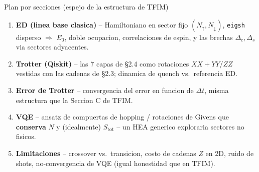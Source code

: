 \documentclass[aspectratio=169,10pt]{beamer}
\newcommand{\good}[1]{\textcolor{qAccent}{\textbf{#1}}}
\begin{document}
\begin{frame}{Plan por secciones (espejo de la estructura de TFIM)}
  \begin{enumerate}
    \item[\good{A}] \textbf{ED (linea base clasica)} -- Hamiltoniano en sector fijo
      $(N_\uparrow,N_\downarrow)$, \texttt{eigsh} disperso $\Rightarrow$ $E_0$, doble ocupacion,
      correlaciones de espin, y las brechas $\Delta_c,\Delta_s$ via sectores adyacentes.
    \item[B] \textbf{Trotter (Qiskit)} -- las 7 capas de \S2.4 como rotaciones
      $XX{+}YY$/$ZZ$ vestidas con las cadenas de \S2.3; dinamica de quench vs.\ referencia ED.
    \item[C] \textbf{Error de Trotter} -- convergencia del error en funcion de $\Delta t$,
      misma estructura que la Seccion C de TFIM.
    \item[D] \textbf{VQE} -- ansatz de compuertas de hopping / rotaciones de Givens que
      \textbf{conserva} $N$ y (idealmente) $S_{\text{tot}}$ -- un HEA generico exploraria
      sectores no fisicos.
    \item[] \textbf{Limitaciones} -- crossover vs.\ transicion, costo de cadenas $Z$ en 2D,
      ruido de shots, no-convergencia de VQE (igual honestidad que en TFIM).
  \end{enumerate}
\end{frame}
\end{document}
